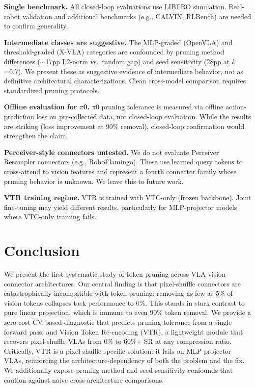 \documentclass[letterpaper]{article}
\begin{document}
\textbf{Single benchmark.}
All closed-loop evaluations use LIBERO simulation.
Real-robot validation and additional benchmarks (e.g., CALVIN, RLBench) are needed to confirm generality.

\textbf{Intermediate classes are suggestive.}
The MLP-graded (OpenVLA) and threshold-graded (X-VLA) categories are confounded by pruning method differences ($\sim$17pp L2-norm vs.\ random gap) and seed sensitivity (28pp at $k$=0.7).
We present these as suggestive evidence of intermediate behavior, not as definitive architectural characterizations.
Clean cross-model comparison requires standardized pruning protocols.

\textbf{Offline evaluation for $\pi$0.}
$\pi$0 pruning tolerance is measured via offline action-prediction loss on pre-collected data, not closed-loop evaluation.
While the results are striking (loss improvement at 90\% removal), closed-loop confirmation would strengthen the claim.

\textbf{Perceiver-style connectors untested.}
We do not evaluate Perceiver Resampler connectors (e.g., RoboFlamingo).
These use learned query tokens to cross-attend to vision features and represent a fourth connector family whose pruning behavior is unknown.
We leave this to future work.

\textbf{VTR training regime.}
VTR is trained with VTC-only (frozen backbone).
Joint fine-tuning may yield different results, particularly for MLP-projector models where VTC-only training fails.

\section{Conclusion}
\label{sec:conclusion}

We present the first systematic study of token pruning across VLA vision connector architectures.
Our central finding is that pixel-shuffle connectors are catastrophically incompatible with token pruning: removing as few as 5\% of vision tokens collapses task performance to 0\%.
This stands in stark contrast to pure linear projection, which is immune to even 90\% token removal.
We provide a zero-cost CV-based diagnostic that predicts pruning tolerance from a single forward pass, and Vision Token Re-encoding (VTR), a lightweight module that recovers pixel-shuffle VLAs from 0\% to 60\%+ SR at any compression ratio.
Critically, VTR is a pixel-shuffle-specific solution: it fails on MLP-projector VLAs, reinforcing the architecture-dependency of both the problem and the fix.
We additionally expose pruning-method and seed-sensitivity confounds that caution against naive cross-architecture comparisons.
\end{document}
